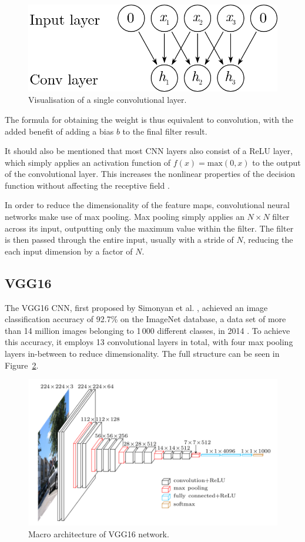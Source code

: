 \begin{figure}[ht]
    \centering
    \includegraphics[width=0.5\linewidth]{content/fig/cnn_layer.png}
    \caption{Visualisation of a single convolutional layer.}
    \label{fig:cnn_layer}
\end{figure}

The formula for obtaining the weight is thus equivalent to convolution, with the added benefit of adding a bias $b$ to the final filter result. 

It should also be mentioned that most CNN layers also consist of a ReLU layer, which simply applies an activation function of $f(x)=\mathrm{max}(0,x)$ to the output of the convolutional layer. 
This increases the nonlinear properties of the decision function without affecting the receptive field \cite{pmlr-v15-glorot11a}.

In order to reduce the dimensionality of the feature maps, convolutional neural networks make use of max pooling.
Max pooling simply applies an $N \times N$ filter across its input, outputting only the maximum value within the filter.
The filter is then passed through the entire input, usually with a stride of $N$, reducing the each input dimension by a factor of $N$.

\subsection{VGG16}

The VGG16 CNN, first proposed by Simonyan et al. \cite{DBLP:journals/corr/SimonyanZ14a}, achieved an image classification accuracy of 92.7\% on the ImageNet database, a data set of more than 14 million images belonging to 1\,000 different classes, in 2014 \cite{ILSVRC15}.
To achieve this accuracy, it employs 13 convolutional layers in total, with four max pooling layers in-between to reduce dimensionality.
The full structure can be seen in Figure~\ref{fig:vgg16}.

\begin{figure}[ht]
    \centering
    \includegraphics[width=0.6\linewidth]{content/fig/vgg16.png}
    \caption{Macro architecture of VGG16 network. \cite{leonardblier_2016}}
    \label{fig:vgg16}
\end{figure}

